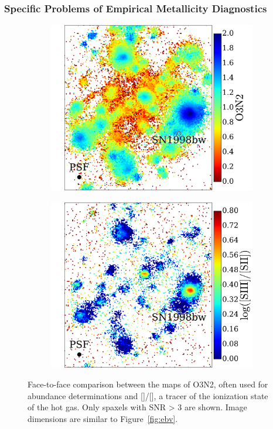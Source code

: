 \documentclass[traditabstract]{aa}
\newcommand{\sii}{[\ion{S}{ii}]}
\newcommand{\siii}{[\ion{S}{iii}]}
\begin{document}
\subsubsection{Specific Problems of Empirical Metallicity Diagnostics}

\begin{figure}
\begin{subfigure}{.24\textwidth}
  \includegraphics[width=0.999\linewidth]{Figs/MUSE_SN1998bw_O3N2.pdf}
\end{subfigure}
\begin{subfigure}{.24\textwidth}
  \includegraphics[width=0.999\linewidth]{Figs/MUSE_SN1998bw_S3S2.pdf}
\end{subfigure}
\caption{Face-to-face comparison between the maps of O3N2, often used for abundance determinations and \siii/\sii, a tracer of the ionization state of the hot gas. Only spaxels with SNR > 3 are shown. Image dimensions are similar to Figure~\ref{fig:ebv}.}
\label{fig:s3s2}
\end{figure}
\end{document}

